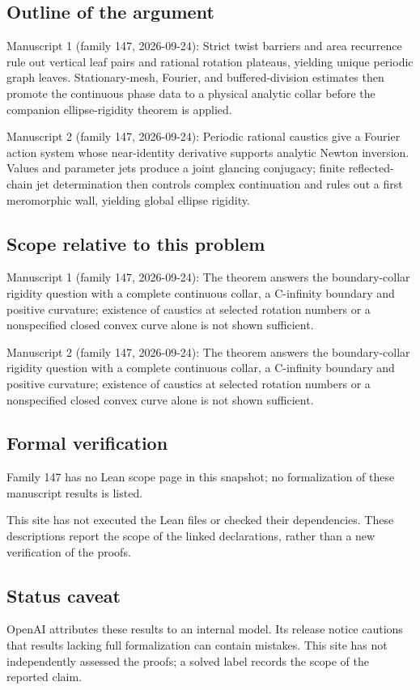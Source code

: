\documentclass[11pt]{article}
\begin{document}
\subsection{Outline of the argument}
Manuscript 1 (family 147, 2026-09-24): Strict twist barriers and area recurrence rule out vertical leaf pairs and rational rotation plateaus, yielding unique periodic graph leaves. Stationary-mesh, Fourier, and buffered-division estimates then promote the continuous phase data to a physical analytic collar before the companion ellipse-rigidity theorem is applied.

Manuscript 2 (family 147, 2026-09-24): Periodic rational caustics give a Fourier action system whose near-identity derivative supports analytic Newton inversion. Values and parameter jets produce a joint glancing conjugacy; finite reflected-chain jet determination then controls complex continuation and rules out a first meromorphic wall, yielding global ellipse rigidity.

\subsection{Scope relative to this problem}
Manuscript 1 (family 147, 2026-09-24): The theorem answers the boundary-collar rigidity question with a complete continuous collar, a C-infinity boundary and positive curvature; existence of caustics at selected rotation numbers or a nonspecified closed convex curve alone is not shown sufficient.

Manuscript 2 (family 147, 2026-09-24): The theorem answers the boundary-collar rigidity question with a complete continuous collar, a C-infinity boundary and positive curvature; existence of caustics at selected rotation numbers or a nonspecified closed convex curve alone is not shown sufficient.

\subsection{Formal verification}
Family 147 has no Lean scope page in this snapshot; no formalization of these manuscript results is listed.

This site has not executed the Lean files or checked their dependencies. These descriptions report the scope of the linked declarations, rather than a new verification of the proofs.

\subsection{Status caveat}
OpenAI attributes these results to an internal model. Its release notice cautions that results lacking full formalization can contain mistakes. This site has not independently assessed the proofs; a solved label records the scope of the reported claim.
\end{document}

